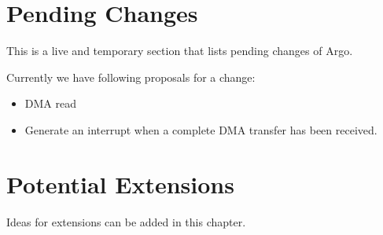 \documentclass[a4paper,fontsize=10pt,twoside,DIV15,BCOR12mm,headinclude=true,footinclude=false,pagesize,bibtotoc]{scrbook}
\begin{document}
\chapter{Pending Changes}

This is a live and temporary section that lists pending changes of Argo.

Currently we have following proposals for a change:

\begin{itemize}
\item DMA read
\item Generate an interrupt when a complete DMA transfer has been received. 
\end{itemize}

\chapter{Potential Extensions}
\label{chap:ext}
Ideas for extensions can be added in this chapter.





\end{document}

